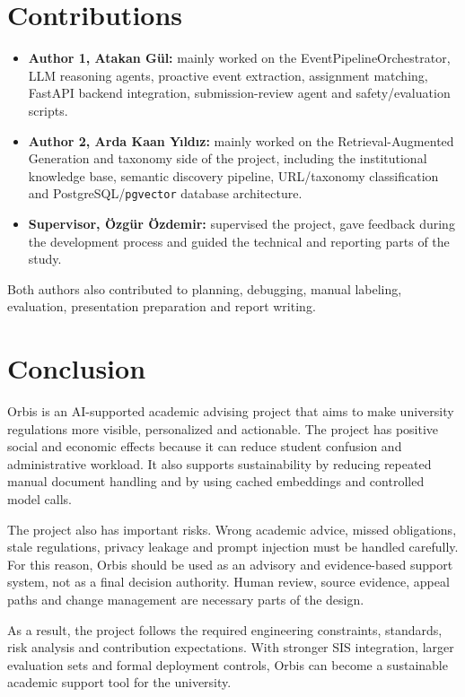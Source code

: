 \documentclass[a4paper,12pt]{article}
\begin{document}
\section{Contributions}
\begin{itemize}
    \item \textbf{Author 1, Atakan Gül:} mainly worked on the EventPipelineOrchestrator, LLM reasoning agents, proactive event extraction, assignment matching, FastAPI backend integration, submission-review agent and safety/evaluation scripts.
    \item \textbf{Author 2, Arda Kaan Yıldız:} mainly worked on the Retrieval-Augmented Generation and taxonomy side of the project, including the institutional knowledge base, semantic discovery pipeline, URL/taxonomy classification and PostgreSQL/\texttt{pgvector} database architecture.
    \item \textbf{Supervisor, Özgür Özdemir:} supervised the project, gave feedback during the development process and guided the technical and reporting parts of the study.
\end{itemize}

Both authors also contributed to planning, debugging, manual labeling, evaluation, presentation preparation and report writing.

\section{Conclusion}
Orbis is an AI-supported academic advising project that aims to make university regulations more visible, personalized and actionable. The project has positive social and economic effects because it can reduce student confusion and administrative workload. It also supports sustainability by reducing repeated manual document handling and by using cached embeddings and controlled model calls.

The project also has important risks. Wrong academic advice, missed obligations, stale regulations, privacy leakage and prompt injection must be handled carefully. For this reason, Orbis should be used as an advisory and evidence-based support system, not as a final decision authority. Human review, source evidence, appeal paths and change management are necessary parts of the design.

As a result, the project follows the required engineering constraints, standards, risk analysis and contribution expectations. With stronger SIS integration, larger evaluation sets and formal deployment controls, Orbis can become a sustainable academic support tool for the university.

\clearpage
{}


\end{document}
